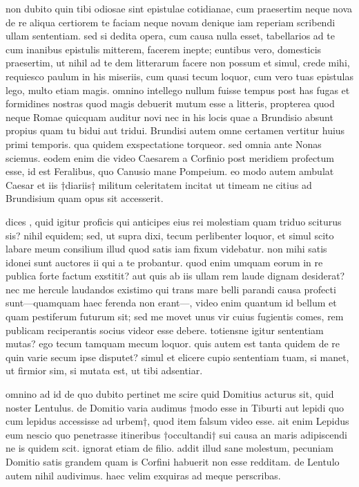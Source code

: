 


 non dubito quin tibi odiosae sint epistulae cotidianae, cum praesertim neque nova de re aliqua certiorem te faciam neque novam denique iam reperiam scribendi ullam sententiam. sed si dedita opera, cum causa nulla esset, tabellarios ad te cum inanibus epistulis mitterem, facerem inepte; euntibus vero, domesticis praesertim, ut nihil ad te dem litterarum facere non possum et simul, crede mihi, requiesco paulum in his miseriis, cum quasi tecum loquor, cum vero tuas epistulas lego, multo etiam magis. omnino intellego nullum fuisse tempus post has fugas et formidines nostras quod magis debuerit mutum esse a litteris, propterea quod neque Romae quicquam auditur novi nec in his locis quae a Brundisio absunt propius quam tu bidui aut tridui. Brundisi autem omne certamen vertitur huius primi temporis. qua quidem exspectatione torqueor. sed omnia ante Nonas sciemus. eodem enim die video Caesarem a Corfinio post meridiem profectum esse, id est Feralibus, quo Canusio mane Pompeium. eo modo autem ambulat Caesar et iis †diariis† militum celeritatem incitat ut timeam ne citius ad Brundisium quam opus sit accesserit.

 dices , quid igitur proficis qui anticipes eius rei molestiam quam triduo sciturus sis? nihil equidem; sed, ut supra dixi, tecum perlibenter loquor, et simul scito labare meum consilium illud quod satis iam fixum videbatur. non mihi satis idonei sunt auctores ii qui a te probantur. quod enim umquam eorum in re publica forte factum exstitit? aut quis ab iis ullam rem laude dignam desiderat? nec me hercule laudandos existimo qui trans mare belli parandi causa profecti sunt—quamquam haec ferenda non erant—, video enim quantum id bellum et quam pestiferum futurum sit; sed me movet unus vir cuius fugientis comes, rem publicam reciperantis socius videor esse debere. totiensne igitur sententiam mutas? ego tecum tamquam mecum loquor. quis autem est tanta quidem de re quin varie secum ipse disputet? simul et elicere cupio sententiam tuam, si manet, ut firmior sim, si mutata est, ut tibi adsentiar.

 omnino ad id de quo dubito pertinet me scire quid Domitius acturus sit, quid noster Lentulus. de Domitio varia audimus †modo esse in Tiburti aut lepidi quo cum lepidus accessisse ad urbem†, quod item falsum video esse. ait enim Lepidus eum nescio quo penetrasse itineribus †occultandi† sui causa an maris adipiscendi ne is quidem scit. ignorat etiam de filio. addit illud sane molestum, pecuniam Domitio satis grandem quam is Corfini habuerit non esse redditam. de Lentulo autem nihil audivimus. haec velim exquiras ad meque perscribas.
